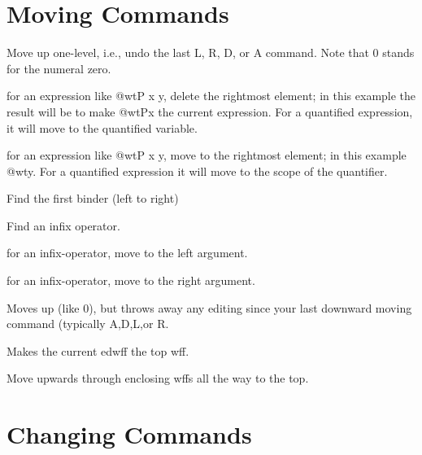 \section{Moving Commands}

\begin{description} 
\item[0]  
Move up one-level, i.e., undo the last L, R, D,
or A command. Note that 0 stands for the numeral zero.

\item[A]  
for an expression like @wt{P x y}, delete the rightmost element;
in this example the result will be to make @wt{Px} the current expression.
For a quantified expression, it will move to the quantified variable.

\item[D]  
for an expression like @wt{P x y}, move to the rightmost element;
in this example @wt{y}.  For a quantified expression it will move
to the scope of the quantifier.

\item[FB]  
Find the first binder (left to right)

\item[FI]  
Find an infix operator.

\item[L]  
for an infix-operator, move to the left argument.

\item[R]  
for an infix-operator, move to the right argument.

\item[UNDO]  
Moves up (like 0), but throws away any editing since your last
downward moving command (typically A,D,L,or R.

\item[XTR]  
Makes the current edwff the top wff.

\item[\textasciicircum ] \index{\textasciicircum } 
Move upwards through enclosing wffs all the way to the top.
\item
\end{description}

\section{Changing Commands}

